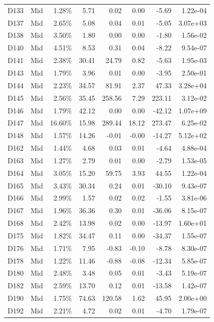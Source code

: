 \begin{tabular}{l l r r r r r r}
D133 & Mid & 1.28\% & 5.71 & 0.02 & 0.00 & -5.69 & 1.22e-04 \\
D137 & Mid & 2.65\% & 5.08 & 0.04 & 0.01 & -5.05 & 3.07e+03 \\
D138 & Mid & 3.50\% & 1.80 & 0.00 & 0.00 & -1.80 & 1.56e-02 \\
D140 & Mid & 4.51\% & 8.53 & 0.31 & 0.04 & -8.22 & 9.54e-07 \\
D141 & Mid & 2.38\% & 30.41 & 24.79 & 0.82 & -5.63 & 1.95e-03 \\
D143 & Mid & 1.79\% & 3.96 & 0.01 & 0.00 & -3.95 & 2.50e-01 \\
D144 & Mid & 2.23\% & 34.57 & 81.91 & 2.37 & 47.33 & 3.28e+04 \\
D145 & Mid & 2.56\% & 35.45 & 258.56 & 7.29 & 223.11 & 3.12e-02 \\
D146 & Mid & 1.79\% & 42.12 & 0.00 & 0.00 & -42.12 & 1.07e+09 \\
D147 & Mid & 16.60\% & 15.98 & 289.44 & 18.12 & 273.47 & 6.25e-02 \\
D148 & Mid & 1.57\% & 14.26 & -0.01 & -0.00 & -14.27 & 5.12e+02 \\
D162 & Mid & 1.44\% & 4.68 & 0.03 & 0.01 & -4.64 & 4.88e-04 \\
D163 & Mid & 1.27\% & 2.79 & 0.01 & 0.00 & -2.79 & 1.53e-05 \\
D164 & Mid & 3.05\% & 15.20 & 59.75 & 3.93 & 44.55 & 1.22e-04 \\
D165 & Mid & 3.43\% & 30.34 & 0.24 & 0.01 & -30.10 & 9.43e-07 \\
D166 & Mid & 2.99\% & 1.57 & 0.02 & 0.02 & -1.55 & 3.81e-06 \\
D167 & Mid & 1.96\% & 36.36 & 0.30 & 0.01 & -36.06 & 8.15e-07 \\
D168 & Mid & 2.42\% & 13.98 & 0.02 & 0.00 & -13.97 & 1.60e+01 \\
D175 & Mid & 1.82\% & 34.47 & 0.11 & 0.00 & -34.37 & 1.55e-07 \\
D176 & Mid & 1.71\% & 7.95 & -0.83 & -0.10 & -8.78 & 8.30e-07 \\
D178 & Mid & 1.22\% & 11.46 & -0.88 & -0.08 & -12.34 & 5.85e-07 \\
D180 & Mid & 2.48\% & 3.48 & 0.05 & 0.01 & -3.43 & 5.19e-07 \\
D182 & Mid & 2.59\% & 13.70 & 0.12 & 0.01 & -13.58 & 1.42e-07 \\
D190 & Mid & 1.75\% & 74.63 & 120.58 & 1.62 & 45.95 & 2.00e+00 \\
D192 & Mid & 2.21\% & 4.72 & 0.02 & 0.01 & -4.70 & 1.79e-07 \\

\end{tabular}

